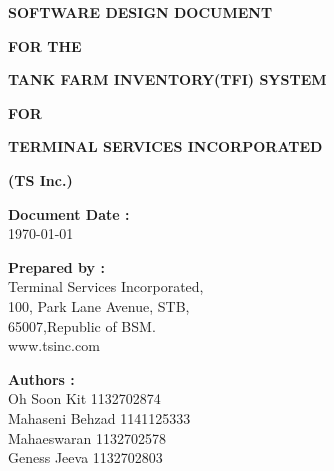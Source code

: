 \documentclass[10pt,a4paper]{report}
\numberwithin{equation}{subsection}
\begin{document}
	
	\thispagestyle{empty}
	\begin{titlepage}
		\null\vfill
		
		\begin{center}
			
		{\Large \textbf{SOFTWARE DESIGN DOCUMENT}}
		\vspace{10mm}
		
		{\Large \textbf{FOR THE}}
		\vspace{10mm}
		
		{\Large \textbf{TANK FARM INVENTORY(TFI) SYSTEM}}
		\vspace{10mm}
		
		{\Large \textbf{FOR}}
		\vspace{10mm}
		
		{\Large \textbf{TERMINAL SERVICES INCORPORATED}}
		\vspace{10mm}
		
		{\Large \textbf{(TS Inc.)}}
		\vspace{10mm}
		
		
		\end{center}
		
		
		\vfill
		\vfill
		
		\begin{flushleft}
			
		\textbf{Document Date :}\\
		\today
		\vspace{7mm}
		
		\textbf{Prepared by :}\\
		Terminal Services Incorporated,\\
		100, Park Lane Avenue, STB,\\
		65007,Republic of BSM.\\
		www.tsinc.com
		\vspace{7mm}
		
		\textbf{Authors :}\\
		Oh Soon Kit 1132702874 \\
		Mahaseni Behzad 1141125333 \\
		Mahaeswaran 1132702578 \\
		Geness Jeeva 1132702803 \\
			
			
			
		\end{flushleft}
		\hfill
	\end{titlepage}


{}
\tableofcontents

{}
\listoffigures





\appendix
\appendixpage
\addappheadtotoc




\end{document}
